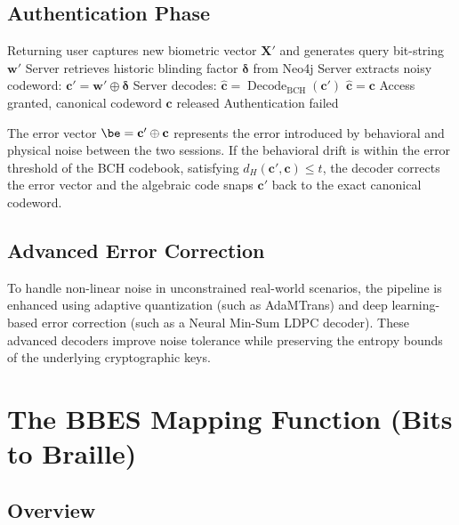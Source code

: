 \documentclass[11pt,twoside]{amsart}
\theoremstyle{plain}
\theoremstyle{definition}
\theoremstyle{remark}
\DeclareMathOperator{\Decode}{Decode}
\newcommand{\bX}{\mathbf{X}}
\newcommand{\bw}{\mathbf{w}}
\newcommand{\bc}{\mathbf{c}}
\newcommand{\bdelta}{\boldsymbol{\delta}}
\begin{document}
\subsection{Authentication Phase}

\begin{algorithm}[htbp]
\caption{BBID Authentication}
\label{alg:auth}
\begin{algorithmic}[1]
\State Returning user captures new biometric vector $\bX'$ and generates query bit-string $\bw'$
\State Server retrieves historic blinding factor $\bdelta$ from Neo4j
\State Server extracts noisy codeword: $\bc' = \bw' \oplus \bdelta$
\State Server decodes: $\hat{\bc} = \Decode_{\text{BCH}}(\bc')$
\If{$d_H(\bc', \bc) \leq t$}
    \State $\hat{\bc} = \bc$ 
    \If{$H(\hat{\bc}) = H(\bc)$}
        \State \Return Access granted, canonical codeword $\bc$ released
    \EndIf
\Else
    \State \Return Authentication failed
\EndIf
\end{algorithmic}
\end{algorithm}

The error vector $\be = \bc' \oplus \bc$ represents the error introduced by behavioral and physical noise between the two sessions. If the behavioral drift is within the error threshold of the BCH codebook, satisfying $d_H(\bc', \bc) \leq t$, the decoder corrects the error vector and the algebraic code snaps $\bc'$ back to the exact canonical codeword.

\subsection{Advanced Error Correction}

To handle non-linear noise in unconstrained real-world scenarios, the pipeline is enhanced using adaptive quantization (such as AdaMTrans) and deep learning-based error correction (such as a Neural Min-Sum LDPC decoder). These advanced decoders improve noise tolerance while preserving the entropy bounds of the underlying cryptographic keys.

\section{The BBES Mapping Function (Bits to Braille)}

\subsection{Overview}
\end{document}
